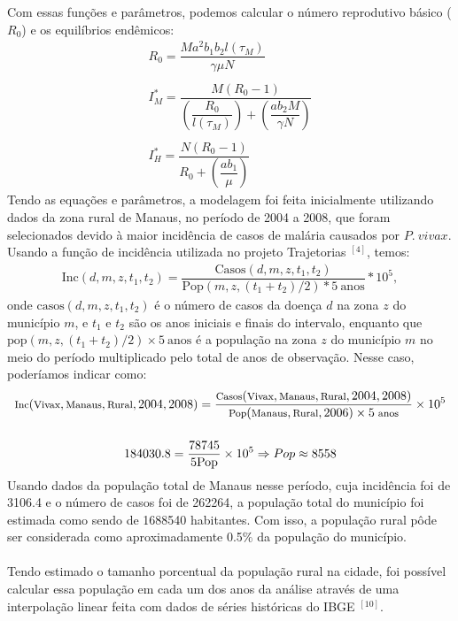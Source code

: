 \documentclass[12pt]{article}
\begin{document}
\\\\
Com essas funções e parâmetros, podemos calcular o número reprodutivo básico ($R_0$) e os equilíbrios endêmicos:
\begin{gather*}
R_0 = \dfrac{Ma^2b_1b_2l(\tau_M)}{\gamma \mu N} \\
\\
I_M^* = \dfrac{M(R_0-1)}{(\dfrac{R_0}{l(\tau_M)}) + (\dfrac{ab_2M}{\gamma N})} \\
\\
I_H^* = \dfrac{N(R_0-1)}{R_0 + (\dfrac{ab_1}{\mu})}
\end{gather*}
\newpage
Tendo as equações e parâmetros, a modelagem foi feita inicialmente utilizando dados da zona rural de Manaus, no período de 2004 a 2008, que foram selecionados devido à maior incidência de casos de malária causados por $P. \ vivax$. Usando a função de incidência utilizada no projeto Trajetorias $^{[4]}$, temos:
\begin{gather*}
    \text{Inc}(d, m, z, t_1, t_2) = \dfrac{\text{Casos}(d, m, z, t_1, t_2)}{\text{Pop}(m,z,(t_1+t_2)/2) * 5 \ \text{anos}} * 10^5,
\end{gather*}
onde $\text{casos}(d, m, z, t_1, t_2)$ é o número de casos da doença $d$ na zona $z$ do município $m$, e $t_1$ e $t_2$ são os anos iniciais e finais do intervalo, enquanto que $\text{pop}(m,z,(t_1+t_2)/2) \times 5 \ \text{anos}$ é a população na zona $z$ do município $m$ no meio do período multiplicado pelo total de anos de observação. Nesse caso, poderíamos indicar como:
\begin{gather*}
    \footnotesize{\text{Inc}(\text{Vivax}, \text{Manaus}, \text{Rural}, 2004, 2008) = \dfrac{\text{Casos}(\text{Vivax}, \text{Manaus}, \text{Rural}, 2004, 2008)}{\text{Pop}(\text{Manaus}, \text{Rural}, 2006) \times 5 \ \text{anos}} \times 10^5}  \\\\
    184030.8 = \dfrac{78745}{5\text{Pop}} \times 10^5 \Rightarrow Pop \approx 8558
\end{gather*}
Usando dados da população total de Manaus nesse período, cuja incidência foi de 3106.4 e o número de casos foi de 262264, a população total do município foi estimada como sendo de 1688540 habitantes. Com isso, a população rural pôde ser considerada como aproximadamente 0.5$\%$ da população do município.
\\\\
Tendo estimado o tamanho porcentual da população rural na cidade, foi possível calcular essa população em cada um dos anos da análise através de uma interpolação linear feita com dados de séries históricas do IBGE $^{[10]}$.
\end{document}

